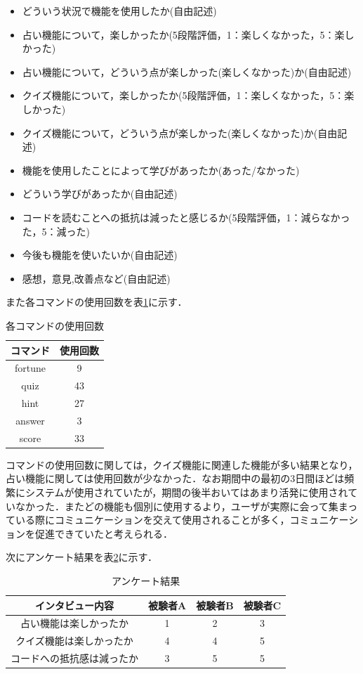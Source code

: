 \begin{itemize}
  \item どういう状況で機能を使用したか(自由記述)
  \item 占い機能について，楽しかったか(5段階評価，1：楽しくなかった，5：楽しかった)
  \item 占い機能について，どういう点が楽しかった(楽しくなかった)か(自由記述)
  \item クイズ機能について，楽しかったか(5段階評価，1：楽しくなかった，5：楽しかった)
  \item クイズ機能について，どういう点が楽しかった(楽しくなかった)か(自由記述)
  \item 機能を使用したことによって学びがあったか(あった/なかった)
  \item どういう学びがあったか(自由記述)
  \item コードを読むことへの抵抗は減ったと感じるか(5段階評価，1：減らなかった，5：減った)
  \item 今後も機能を使いたいか(自由記述)
  \item 感想，意見,改善点など(自由記述)
\end{itemize}

また各コマンドの使用回数を表\ref{command}に示す．

\begin{table}[!h]
  \centering
  \caption{各コマンドの使用回数}
  \label{command}
    \begin{tabular}{|c|c|} \hline
      コマンド & 使用回数 \\ \hline \hline
      fortune & 9 \\ \hline
      quiz & 43 \\ \hline
      hint & 27 \\ \hline
      answer & 3 \\ \hline
      score & 33 \\ \hline
    \end{tabular}
\end{table}

コマンドの使用回数に関しては，クイズ機能に関連した機能が多い結果となり，占い機能に関しては使用回数が少なかった．なお期間中の最初の3日間ほどは頻繁にシステムが使用されていたが，期間の後半おいてはあまり活発に使用されていなかった．またどの機能も個別に使用するより，ユーザが実際に会って集まっている際にコミュニケーションを交えて使用されることが多く，コミュニケーションを促進できていたと考えられる．

次にアンケート結果を表\ref{interview}に示す．
\begin{table}[!b]
  \centering
  \caption{アンケート結果}
  \label{interview}
    \begin{tabular}{|c|c|c|c|} \hline
      インタビュー内容 & 被験者A & 被験者B & 被験者C \\ \hline \hline
      占い機能は楽しかったか & 1 & 2 & 3 \\ \hline
      クイズ機能は楽しかったか & 4 & 4 & 5 \\ \hline
      コードへの抵抗感は減ったか & 3 & 5 &5 \\ \hline
    \end{tabular}
\end{table}

